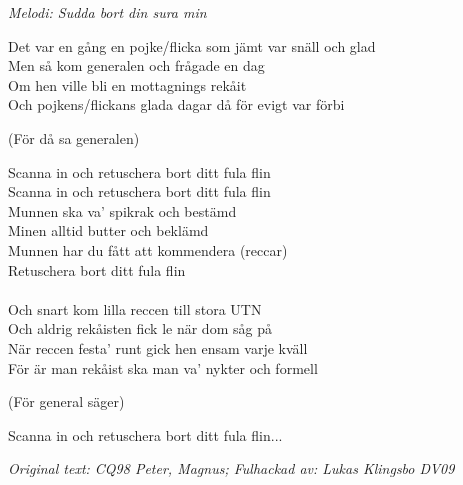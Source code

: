 {\footnotesize\textit{Melodi: Sudda bort din sura min}}\par
\vspace{10pt}
Det var en gång en pojke/flicka som jämt var snäll och glad\\
Men så kom generalen och frågade en dag\\
Om hen ville bli en mottagnings rekåit\\
Och pojkens/flickans glada dagar då för evigt var förbi\par
\vspace{10pt}
(För då sa generalen)\par
\vspace{10pt}
Scanna in och retuschera bort ditt fula flin\\
Scanna in och retuschera bort ditt fula flin\\
Munnen ska va' spikrak och bestämd\\
Minen alltid butter och beklämd\\
Munnen har du fått att kommendera (reccar)\\
Retuschera bort ditt fula flin\\
\\
Och snart kom lilla reccen till stora UTN\\
Och aldrig rekåisten fick le när dom såg på\\
När reccen festa' runt gick hen ensam varje kväll\\
För är man rekåist ska man va' nykter och formell\par
\vspace{10pt}
(För general säger)\par
\vspace{10pt}
Scanna in och retuschera bort ditt fula flin...
\par
\vspace{10pt}
{\footnotesize\textit{Original text: CQ98 Peter, Magnus; Fulhackad av: Lukas Klingsbo DV09}}
